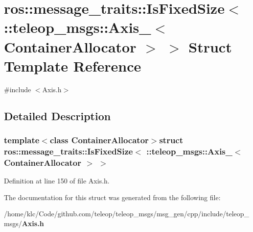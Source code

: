 \section{ros::message\_\-traits::IsFixedSize$<$ ::teleop\_\-msgs::Axis\_\-$<$ ContainerAllocator $>$ $>$ Struct Template Reference}
\label{structros_1_1message__traits_1_1IsFixedSize_3_01_1_1teleop__msgs_1_1Axis___3_01ContainerAllocator_01_4_01_4}


{\ttfamily \#include $<$Axis.h$>$}



\subsection{Detailed Description}
\subsubsection*{template$<$class ContainerAllocator$>$struct ros::message\_\-traits::IsFixedSize$<$ ::teleop\_\-msgs::Axis\_\-$<$ ContainerAllocator $>$ $>$}



Definition at line 150 of file Axis.h.



The documentation for this struct was generated from the following file:\begin{DoxyCompactItemize}
\item 
/home/klc/Code/github.com/teleop/teleop\_\-msgs/msg\_\-gen/cpp/include/teleop\_\-msgs/{\bf Axis.h}\end{DoxyCompactItemize}
